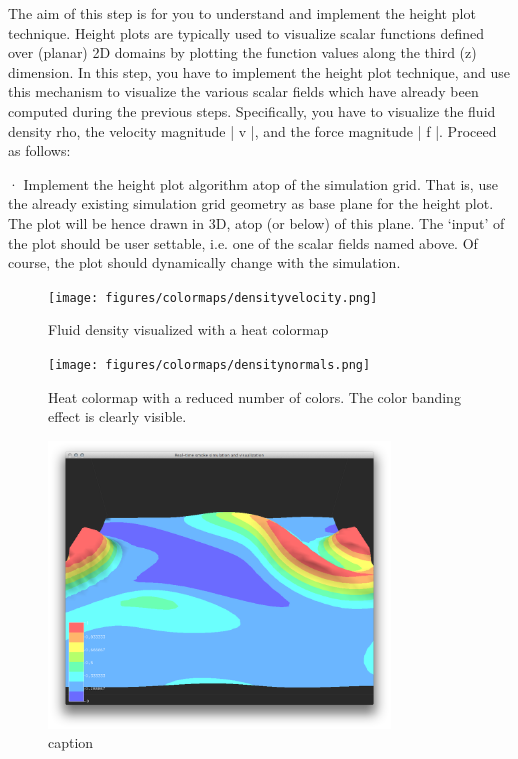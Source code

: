 
The aim of this step is for you to understand and implement the height plot technique. Height plots are typically used to visualize scalar functions defined over (planar) 2D domains by plotting the function values along the third (z) dimension. In this step, you have to implement the height plot technique, and use this mechanism to visualize the various scalar fields which have already been computed during the previous steps. Specifically, you have to visualize the fluid density rho, the velocity magnitude | v |, and the force magnitude | f |. Proceed as follows:
 
 
 
·        Implement the height plot algorithm atop of the simulation grid. That is, use the already existing simulation grid geometry as base plane for the height plot. The plot will be hence drawn in 3D, atop (or below) of this plane. The ‘input’ of the plot should be user settable, i.e. one of the scalar fields named above. Of course, the plot should dynamically change with the simulation.


\begin{figure}[htbp]
\centering
\begin{minipage}[t]{0.48\textwidth}
        \texttt{[image: figures/colormaps/densityvelocity.png]}
\caption{Fluid density visualized with a heat colormap}
\label{fig:heatmap}
\end{minipage}\hspace{.04\textwidth}%
\begin{minipage}[t]{0.48\textwidth}
        \texttt{[image: figures/colormaps/densitynormals.png]}
    \caption{Heat colormap with a reduced number of colors. The color banding effect is clearly visible.}
    \label{fig:banding}
\end{minipage}
\end{figure}

\begin{figure}[htbp]
    \centering \includegraphics[height=3in]{figures/heightplot/densitydensitybanding.png}
    \caption{caption}
    \label{fig:figures_heightplot_densitydensitybanding}
\end{figure}



